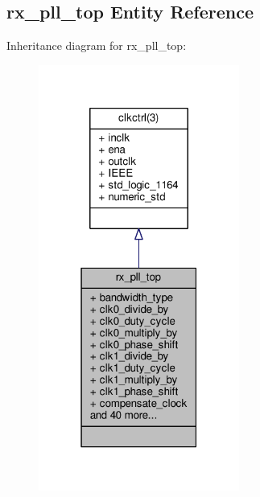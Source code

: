 \subsection{rx\+\_\+pll\+\_\+top Entity Reference}
\label{classrx__pll__top}


Inheritance diagram for rx\+\_\+pll\+\_\+top\+:\nopagebreak
\begin{figure}[H]
\begin{center}
\leavevmode
\includegraphics[width=187pt]{d0/d62/classrx__pll__top__inherit__graph}
\end{center}
\end{figure}


